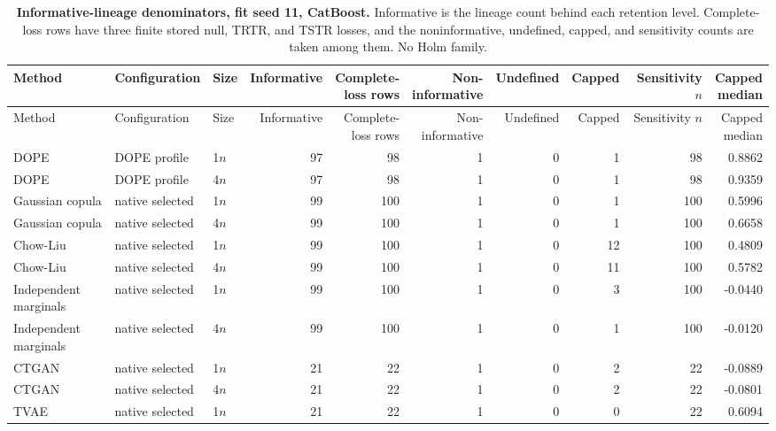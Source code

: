 \begin{longtable}{lllrrrrrrr}
\caption{\textbf{Informative-lineage denominators, fit seed 11, CatBoost.} Informative is the lineage count behind each retention level. Complete-loss rows have three finite stored null, TRTR, and TSTR losses, and the noninformative, undefined, capped, and sensitivity counts are taken among them. No Holm family.}\label{tab:review-denominator}\\
\toprule
Method & Configuration & Size & Informative & \shortstack[r]{Complete-\\loss rows} & \shortstack[r]{Non-\\informative} & Undefined & Capped & \shortstack[r]{Sensitivity\\$n$} & \shortstack[r]{Capped\\median} \\
\midrule
\endfirsthead
\toprule
Method & Configuration & Size & Informative & \shortstack[r]{Complete-\\loss rows} & \shortstack[r]{Non-\\informative} & Undefined & Capped & \shortstack[r]{Sensitivity\\$n$} & \shortstack[r]{Capped\\median} \\
\midrule
\endhead
DOPE & DOPE profile & 1$n$ & 97 & 98 & 1 & 0 & 1 & 98 & 0.8862 \\
DOPE & DOPE profile & 4$n$ & 97 & 98 & 1 & 0 & 1 & 98 & 0.9359 \\
Gaussian copula & native selected & 1$n$ & 99 & 100 & 1 & 0 & 1 & 100 & 0.5996 \\
Gaussian copula & native selected & 4$n$ & 99 & 100 & 1 & 0 & 1 & 100 & 0.6658 \\
Chow-Liu & native selected & 1$n$ & 99 & 100 & 1 & 0 & 12 & 100 & 0.4809 \\
Chow-Liu & native selected & 4$n$ & 99 & 100 & 1 & 0 & 11 & 100 & 0.5782 \\
Independent marginals & native selected & 1$n$ & 99 & 100 & 1 & 0 & 3 & 100 & -0.0440 \\
Independent marginals & native selected & 4$n$ & 99 & 100 & 1 & 0 & 1 & 100 & -0.0120 \\
CTGAN & native selected & 1$n$ & 21 & 22 & 1 & 0 & 2 & 22 & -0.0889 \\
CTGAN & native selected & 4$n$ & 21 & 22 & 1 & 0 & 2 & 22 & -0.0801 \\
TVAE & native selected & 1$n$ & 21 & 22 & 1 & 0 & 0 & 22 & 0.6094 \\

\end{longtable}
